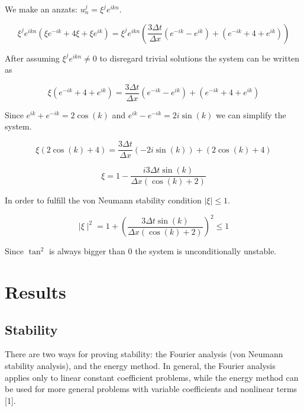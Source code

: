 \documentclass[a4paper,10pt,twoside]{article}
\begin{document}
We make an anzats: $u_n^j = \xi^{j}e^{ikn}$.

\begin{equation}
        \xi^{j}e^{ikn}(\xi e^{-ik}+4\xi+\xi e^{ik}) = \xi^je^{ikn}\left(\frac{3 \Delta t}{ \Delta x}\left(e^{-ik} - e^{ik}\right) + \left(e^{-ik} + 4 + e^{ik}\right)\right)
\end{equation}

After assuming $\xi^je^{ikn} \neq 0$ to disregard trivial solutions the system can be written as


\begin{equation}
        \xi \left(e^{-ik}+4+e^{ik}\right) = \frac{3 \Delta t}{\Delta x}\left(e^{-ik} - e^{ik}\right) + \left(e^{-ik} + 4 + e^{ik}\right)
\end{equation}

Since $e^{ik} + e^{-ik} = 2\cos(k)$ and $e^{ik} - e^{-ik} = 2i \sin(k)$ we can simplify the system.

\begin{equation}
        \xi \left(2\cos(k) +4\right) = \frac{3 \Delta t}{\Delta x}\left(-2i \sin(k)\right) + \left(2\cos(k) + 4\right)
\end{equation}


\begin{equation}
        \xi  = 1 - \frac{i3 \Delta t \sin(k)}{\Delta x\left(\cos(k) +2\right)} 
\end{equation}

In order to fulfill the von Neumann stability condition $\mid  \xi \mid \leq 1$.

\begin{equation}
    \mid \xi \mid^2 = 1 + \left(\frac{3 \Delta t \sin(k)}{\Delta x\left(\cos(k) +2\right)}\right)^2 \leq 1
\end{equation}

Since $\tan^2$ is always bigger than 0 the system is unconditionally unstable.

\section{Results}
\subsection{Stability}
There are two ways for proving stability: the Fourier
analysis (von Neumann stability analysis), and the energy method.
In general, the Fourier analysis applies only to linear constant coefficient
problems, while the energy method can be used for more general
problems with variable coefficients and nonlinear terms [1].
\end{document}
